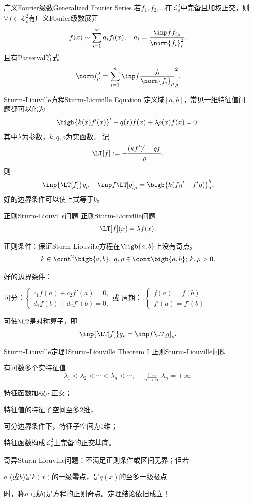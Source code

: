 \begin{theorem}{广义Fourier级数}{Generalized Fourier Series}
	若$f_1,f_2,\ldots$在$\mathscr L_\rho^2$中完备且加权正交，则$\forall f\in\mathscr L_\rho^2$有广义Fourier级数展开
	\[
		f(x)\sim\sum_{i=1}^\infty a_if_i(x),\quad a_i=\frac{\inp f{f_i}_\rho}{\norm{f_i}^2_\rho}.
	\]
	且有Parserval等式
	\[
		\norm f_\rho^2=\sum_{i=1}^n\inp f{\frac{f_i}{\norm{f_i}_\rho}}_\rho^2.
	\]
\end{theorem}
\begin{definition}{Sturm-Liouville方程}{Sturm-Liouville Equation}
	定义域$[a,b]$，常见一维特征值问题都可以化为
	\[
		\bigb{k(x)f'(x)}'-q(x)f(x)+\lambda\rho(x)f(x)=0.
	\]
	其中$\lambda$为参数，$k,q,\rho$为实函数。
	记
	\[
		\LT[f]:=-\frac{(kf')'-qf}\rho.
	\]
	则
	\[
		\inp{\LT[f]}g_\rho-\inp f{\LT[g]}_\rho=\bigb{k(fg'-f'g)}_a^b.
	\]
	好的边界条件可以使上式等于0。
\end{definition}
\begin{definition}{正则Sturm-Liouville问题}{}
    正则Sturm-Liouville问题
    \[
    	\LT[f](x)=\lambda f(x).
    \]
    
    正则条件：保证Sturm-Liouville方程在$\bigb{a,b}$上没有奇点。
    \[
    	k\in\cont^2\bigb{a,b},\;q,\rho\in\cont\bigb{a,b};\;k,\rho>0.
    \]
    
    
    好的边界条件：
    \begin{center}
    	可分：$\begin{cases}
    			c_1f(a)+c_2f'(a)=0, \\
    			d_1f(b)+d_2f'(b)=0.
    		\end{cases}$\quad 或 \quad 周期：
    	$\begin{cases}
    			f(a)=f(b) \\
    			f'(a)=f'(b)
    		\end{cases}$
    \end{center}
    可使$\LT$是对称算子，即
    \[
    	\inp{\LT[f]}g_\rho=\inp f{\LT[g]}_\rho.
    \]
\end{definition}
\begin{theorem}{Sturm-Liouville定理1}{Sturm-Liouville Theorem I}
	正则Sturm-Liouville问题
	\begin{compactenum}
		\item 有可数多个实特征值
		      \[
				\lambda_1<\lambda_2<\cdots<\lambda_n<\cdots,\quad\lim_{n\to\infty}\lambda_n=+\infty.
			  \]
		\item 特征函数加权$\rho$\;-\;正交；
		\item 特征值的特征子空间至多2维，

		      可分边界条件下，特征子空间为1维；
		\item 特征函数构成$\mathscr L_\rho^2$上完备的正交基底。
	\end{compactenum}
    \tcblower
    奇异Sturm-Liouville问题：不满足正则条件或区间无界；但若
    \begin{center}
        $a$ (或$b$)是$k(x)$的一级零点，是$q(x)$的至多一级极点 
    \end{center}
    时，称$a$ (或$b$)是方程的正则奇点。定理结论依旧成立！
\end{theorem}
